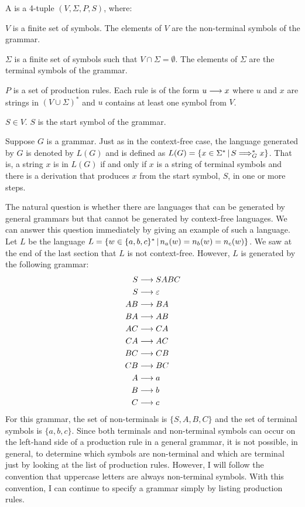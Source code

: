 \begin{definition}
A  is a 4-tuple $(V,\Sigma,P,S)$,
where:

$V$ is a finite set of symbols.  The elements of $V$
are the non-terminal symbols of the grammar.

$\Sigma$ is a finite set of symbols such that $V\cap\Sigma=\emptyset$.
The elements of $\Sigma$ are the terminal symbols of the grammar.

$P$ is a set of production rules.  Each rule is of the
form $u\longrightarrow x$ where $u$ and $x$ are strings in $(V\cup \Sigma)^*$
and $u$ contains at least one symbol from $V$.

$S\in V$.  $S$ is the start symbol of the grammar.
\end{definition}

Suppose $G$ is a grammar.  Just as in the context-free case,
the language generated by $G$ is denoted by $L(G)$ and is defined
as $L(G)=\{x\in\Sigma^*\,|\, S \Longrightarrow_G^* x\}$.  That is, a string
$x$ is in $L(G)$ if and only if $x$ is a string of terminal symbols
and there is a derivation that produces $x$ from the start symbol,
$S$, in one or more steps.

The natural question is whether there are languages that can be generated
by general grammars but that cannot be generated by context-free languages.
We can answer this question immediately by giving an example of such
a language.  Let $L$ be the language $L=\{w\in\{a,b,c\}^*\,|\, n_a(w)=n_b(w)=n_c(w)\}$.
We saw at the end of the last section that $L$ is not context-free.
However, $L$ is generated by the following grammar:
\begin{align*}
  S&\longrightarrow SABC\\
  S&\longrightarrow \varepsilon\\
  AB&\longrightarrow BA\\
  BA&\longrightarrow AB\\
  AC&\longrightarrow CA\\
  CA&\longrightarrow AC\\
  BC&\longrightarrow CB\\
  CB&\longrightarrow BC\\
  A&\longrightarrow a\\
  B&\longrightarrow b\\
  C&\longrightarrow c
\end{align*}
For this grammar, the set of non-terminals is $\{S,A,B,C\}$ and the set of
terminal symbols is $\{a,b,c\}$.  Since both terminals and non-terminal
symbols can occur on the left-hand side of a production rule in a general
grammar, it is not possible, in general, to determine which symbols are non-terminal and
which are terminal just by looking at the list of production rules.
However, I will follow the convention that uppercase letters are always
non-terminal symbols.  With this convention, I can continue to specify a
grammar simply by listing production rules.

